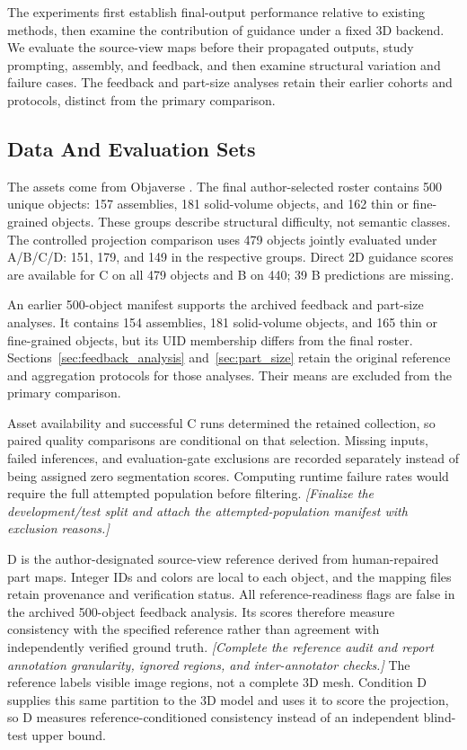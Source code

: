 \documentclass[pdflatex,iicol,sn-apa]{sn-jnl}
\newcommand{\pending}[1]{{\color{DraftText}\textit{[#1]}}}
\begin{document}
The experiments first establish final-output performance relative to existing methods, then examine the contribution of guidance under a fixed 3D backend. We evaluate the source-view maps before their propagated outputs, study prompting, assembly, and feedback, and then examine structural variation and failure cases. The feedback and part-size analyses retain their earlier cohorts and protocols, distinct from the primary comparison.

\subsection{Data And Evaluation Sets}
The assets come from Objaverse \citep{deitke2023objaverse}. The final author-selected roster contains 500 unique objects: 157 assemblies, 181 solid-volume objects, and 162 thin or fine-grained objects. These groups describe structural difficulty, not semantic classes. The controlled projection comparison uses 479 objects jointly evaluated under A/B/C/D: 151, 179, and 149 in the respective groups. Direct 2D guidance scores are available for C on all 479 objects and B on 440; 39 B predictions are missing.

An earlier 500-object manifest supports the archived feedback and part-size analyses. It contains 154 assemblies, 181 solid-volume objects, and 165 thin or fine-grained objects, but its UID membership differs from the final roster. Sections~\ref{sec:feedback_analysis} and~\ref{sec:part_size} retain the original reference and aggregation protocols for those analyses. Their means are excluded from the primary comparison.

Asset availability and successful C runs determined the retained collection, so paired quality comparisons are conditional on that selection. Missing inputs, failed inferences, and evaluation-gate exclusions are recorded separately instead of being assigned zero segmentation scores. Computing runtime failure rates would require the full attempted population before filtering. \pending{Finalize the development/test split and attach the attempted-population manifest with exclusion reasons.}

D is the author-designated source-view reference derived from human-repaired part maps. Integer IDs and colors are local to each object, and the mapping files retain provenance and verification status. All reference-readiness flags are false in the archived 500-object feedback analysis. Its scores therefore measure consistency with the specified reference rather than agreement with independently verified ground truth. \pending{Complete the reference audit and report annotation granularity, ignored regions, and inter-annotator checks.} The reference labels visible image regions, not a complete 3D mesh. Condition D supplies this same partition to the 3D model and uses it to score the projection, so D measures reference-conditioned consistency instead of an independent blind-test upper bound.
\end{document}
